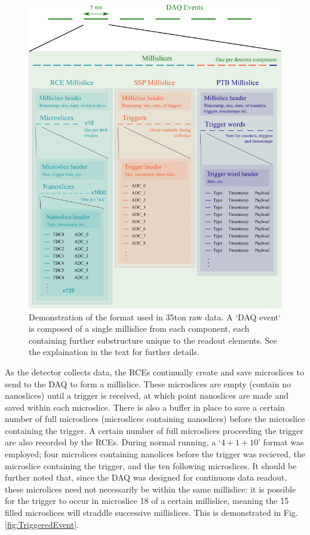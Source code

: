 \begin{figure}[p]
  \centering
  \includegraphics[width=14cm]{data_format.png}
  \caption[35ton data format]{Demonstration of the format used in 35ton raw data.  A `DAQ event` is composed of a single millislice from each component, each containing further substructure unique to the readout elements.  See the explaination in the text for further details.}
  \label{fig:DataFormat}
\end{figure}

As the detector collects data, the RCEs continually create and save microslices to send to the DAQ to form a millislice.  These microslices are empty (contain no nanoslices) until a trigger is received, at which point nanoslices are made and saved within each microslice.  There is also a buffer in place to save a certain number of full microslices (microslices containing nanoslices) before the microslice containing the trigger.  A certain number of full microslices proceeding the trigger are also recorded by the RCEs.  During normal running, a `$4+1+10$' format was employed; four microlices containing nanolices before the trigger was recieved, the microslice containing the trigger, and the ten following microslices.  It should be further noted that, since the DAQ was designed for continuous data readout, these microlices need not necessarily be within the same millislice: it is possible for the trigger to occur in microslice 18 of a certain millislice, meaning the 15 filled microslices will straddle successive millislices.  This is demonstrated in Fig. \ref{fig:TriggeredEvent}.

